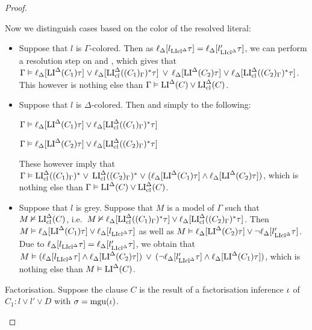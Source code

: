 \documentclass[,%
	draft=false,%
	numbers=noendperiod
	11pt,
	a4paper,
	oneside,%
	openany,
]{memoir}
\begin{document}
\begin{proof}
\begin{description}
			Now we distinguish cases based on the color of the resolved literal:

			\begin{itemize}
				\item Suppose that $l$ is $\Gamma$-colored.
					Then as
					$\ell_{\Delta}[l_{\operatorname{LIcl}^\Delta}\tau] = 
					\ell_{\Delta}[l'_{\operatorname{LIcl}^\Delta}\tau]$, 
					we can perform a resolution step on \markA{} and \markB{}, which gives that
					$\Gamma \vDash
					\ell_{\Delta}[\operatorname{LI}^\Delta(C_1)\tau] \;{\lor}\; \ell_{\Delta}[\operatorname{LI}_{\operatorname{cl}}^\Delta( (C_1)_\Gamma )^*\tau] \;\,{\lor}\;\, 
					\ell_{\Delta}[\operatorname{LI}^\Delta(C_2)\tau] \;{\lor}\; \ell_{\Delta}[\operatorname{LI}_{\operatorname{cl}}^\Delta( (C_2)_\Gamma )^*\tau]$.
					This however is nothing else than $\Gamma\vDash \operatorname{LI}^\Delta(C) \lor \operatorname{LI}_{\operatorname{cl}}^\Delta(C)$.

				\item Suppose that $l$ is $\Delta$-colored. Then \markA{} and \markB{} simply to the following:

					$\Gamma \vDash \ell_{\Delta}[\operatorname{LI}^\Delta(C_1)\tau] \lor \ell_{\Delta}[\operatorname{LI}_{\operatorname{cl}}^\Delta( (C_1)_\Gamma )^*\tau]$

					$\Gamma \vDash \ell_{\Delta}[\operatorname{LI}^\Delta(C_2)\tau] \lor \ell_{\Delta}[\operatorname{LI}_{\operatorname{cl}}^\Delta( (C_2)_\Gamma )^*\tau]$

					These however imply that 
					$\Gamma \vDash 
					\operatorname{LI}_{\operatorname{cl}}^\Delta( (C_1)_\Gamma )^* \;{\lor}\; \operatorname{LI}_{\operatorname{cl}}^\Delta( (C_2)_\Gamma )^* \;{\lor}\;\allowbreak
					(\ell_{\Delta}[\operatorname{LI}^\Delta(C_1)\tau] \land
					\ell_{\Delta}[\operatorname{LI}^\Delta(C_2)\tau] )$, which is nothing else than
					$\Gamma \vDash \operatorname{LI}^\Delta(C) \lor \operatorname{LI}_{\operatorname{cl}}^\Delta(C)$.

				\item Suppose that $l$ is grey.
					Suppose that $M$ is a model of $\Gamma$ such that
					$M\nvDash \operatorname{LI}_{\operatorname{cl}}^\Delta(C)$, i.e.\ 
					$M\nvDash \ell_{\Delta}[\operatorname{LI}_{\operatorname{cl}}^\Delta( (C_1)_\Gamma )^*\tau] \lor \ell_{\Delta}[\operatorname{LI}_{\operatorname{cl}}^\Delta( (C_2)_\Gamma )^*\tau]$.
					Then $M \vDash \ell_{\Delta}[\operatorname{LI}^\Delta(C_1)\tau] \lor \ell_{\Delta}[l_{\operatorname{LIcl}^\Delta}\tau]$
					as well as 
					$M \vDash \ell_{\Delta}[\operatorname{LI}^\Delta(C_2)\tau] \lor \lnot \ell_{\Delta}[l'_{\operatorname{LIcl}^\Delta}\tau]$.
					Due to $\ell_{\Delta}[l_{\operatorname{LIcl}^\Delta}\tau] = 
					\ell_{\Delta}[l'_{\operatorname{LIcl}^\Delta}\tau]$,
					we obtain that
					$M\vDash (\ell_{\Delta}[l_{\operatorname{LIcl}^\Delta}\tau] \land \ell_{\Delta}[\operatorname{LI}^\Delta(C_2)\tau]) \;\,{\lor}\;\,
					(\lnot \ell_{\Delta}[l'_{\operatorname{LIcl}^\Delta}\tau] \land \ell_{\Delta}[\operatorname{LI}^\Delta(C_1)\tau])$,
					which is nothing else than $M\vDash \operatorname{LI}^\Delta(C)$.

			\end{itemize}


		\item{} Factorisation. 
			Suppose the clause $C$ is the result of a factorisation inference $\iota$ of $C_1: l \lor l' \lor D$ with $\sigma=\operatorname{mgu}(\iota)$.


\end{description}
\end{proof}
\end{document}
